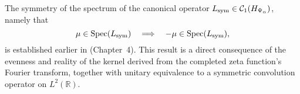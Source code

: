 \begin{remark}
\label{rmk:spectral_symmetry_forward_ref}
The symmetry of the spectrum of the canonical operator \( L_{\mathrm{sym}} \in \mathcal{C}_1(H_{\Psi_\alpha}) \),
namely that
\[
\mu \in \operatorname{Spec}(L_{\mathrm{sym}}) \quad \Longrightarrow \quad -\mu \in \operatorname{Spec}(L_{\mathrm{sym}}),
\]
is established earlier in  (Chapter~4). This result is a direct consequence of the
evenness and reality of the kernel derived from the completed zeta function’s Fourier transform, together
with unitary equivalence to a symmetric convolution operator on \( L^2(\mathbb{R}) \).
\end{remark}
